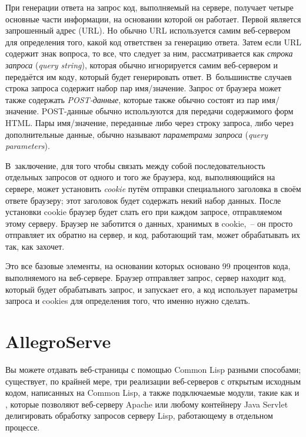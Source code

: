 При генерации ответа на запрос код, выполняемый на сервере, получает четыре основные
части информации, на основании которой он работает. Первой является запрошенный адрес
(URL). Но обычно URL используется самим веб-сервером для определения того, какой код
ответствен за генерацию ответа. Затем если URL содержит знак вопроса, то все, что
следует за ним, рассматривается как \textit{строка запроса} (\textit{query string}),
которая обычно игнорируется самим веб-сервером и передаётся им коду, который будет
генерировать ответ. В~большинстве случаев строка запроса содержит набор пар
имя/значение. Запрос от браузера может также содержать \textit{POST-данные}, которые также
обычно состоят из пар имя/значение. POST-данные обычно используются для передачи
содержимого форм HTML. Пары имя/значение, переданные либо через строку запроса, либо через
дополнительные данные, обычно называют \textit{параметрами запроса} (\textit{query
  parameters}).

В~заключение, для того чтобы связать между собой последовательность отдельных запросов от
одного и того же браузера, код, выполняющийся на сервере, может установить \textit{cookie}
путём отправки специального заголовка в своём ответе браузеру; этот заголовок будет
содержать некий набор данных. После установки cookie браузер будет слать его при каждом
запросе, отправляемом этому серверу. Браузер не заботится о данных, хранимых в cookie,~--
он просто отправляет их обратно на сервер, и код, работающий там, может обрабатывать их
так, как захочет.

Это все базовые элементы, на основании которых основано 99 процентов кода, выполняемого на
веб-сервере. Браузер отправляет запрос, сервер находит код, который будет обрабатывать
запрос, и запускает его, а код использует параметры запроса и cookies для определения
того, что именно нужно сделать.

\section{AllegroServe}

Вы можете отдавать веб-страницы с помощью Common Lisp разными способами; существует, по
крайней мере, три реализации веб-серверов с открытым исходным кодом, написанных на Common
Lisp, а также подключаемые модули, такие как
 и
, которые позволяют веб-серверу Apache
или любому контейнеру Java Servlet делигировать обработку запросов серверу Lisp,
работающему в отдельном процессе.

